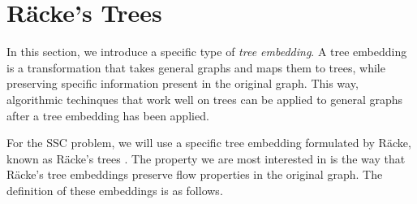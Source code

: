 \documentclass[12pt]{article}
\newtheorem{definition}{Definition}
\begin{document}
%
%

\section{R\"{a}cke's Trees}
\label{sec:rackestrees}

In this section, we introduce a specific type of \emph{tree embedding}. A tree embedding is a transformation that takes general graphs and maps them to trees, while preserving specific information present in the original graph. This way, algorithmic techinques that work well on trees can be applied to general graphs after a tree embedding has been applied. 

For the SSC problem, we will use a specific tree embedding formulated by R\"{a}cke, known as R\"{a}cke's trees \cite{racke}. The property we are most interested in is the way that R\"{a}cke's tree embeddings preserve flow properties in the original graph. The definition of these embeddings is as follows.
\end{document}
